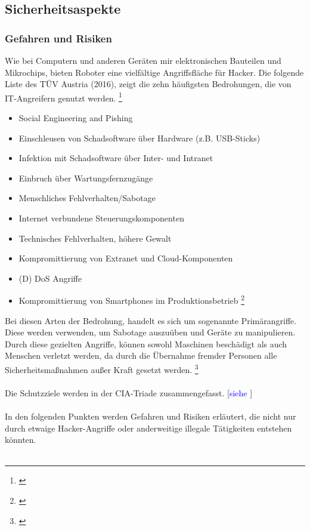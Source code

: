 \documentclass[titlepage,12pt,twoside]{article}
\begin{document}
\subsection{Sicherheitsaspekte}
\subsubsection{Gefahren und Risiken}
Wie bei Computern und anderen Geräten mir elektronischen Bauteilen und Mikrochips, 
bieten Roboter eine vielfältige Angriffsfläche für Hacker. Die folgende Liste des 
TÜV Austria (2016), zeigt die zehn häufigsten Bedrohungen, die von IT-Angreifern 
genutzt werden. \footnote{\cite{TÜVaustria}} \\
\begin{itemize}
	\item Social Engineering and Pishing
	\item Einschleusen von Schadsoftware über Hardware (z.B. USB-Sticks)
	\item Infektion mit Schadsoftware über Inter- und Intranet
	\item Einbruch über Wartungsfernzugänge
	\item Menschliches Fehlverhalten/Sabotage
	\item Internet verbundene Steuerungskomponenten
	\item Technisches Fehlverhalten, höhere Gewalt
	\item Kompromittierung von Extranet und Cloud-Komponenten
	\item (D) DoS Angriffe
	\item Kompromittierung von Smartphones im Produktionsbetrieb \footnote{\cite{TÜVaustria}}
\end{itemize}
\hfill \break
Bei diesen Arten der Bedrohung, handelt es sich um sogenannte Primärangriffe. 
Diese werden verwenden, um Sabotage auszuüben und Geräte zu manipulieren. Durch 
diese gezielten Angriffe, können sowohl Maschinen beschädigt als auch Menschen 
verletzt werden, da durch die Übernahme fremder Personen alle Sicherheitsmaßnahmen 
außer Kraft gesetzt werden. \footnote{\cite{TÜVaustria}}\\
\\
Die Schutzziele werden in der CIA-Triade zusammengefasst. [\textcolor{blue}{siehe \cite{CIAtriade}}] \\
\\
In den folgenden Punkten werden Gefahren und Risiken erläutert, die nicht nur 
durch etwaige Hacker-Angriffe oder anderweitige illegale Tätigkeiten entstehen 
könnten. \\
\\
\end{document}
